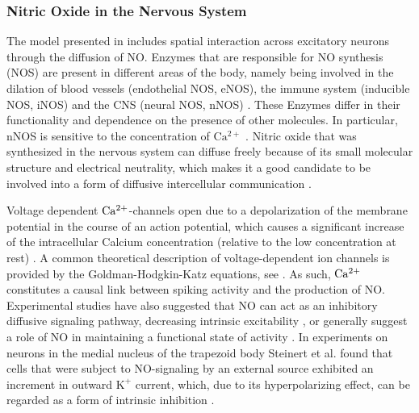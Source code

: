 \documentclass[10pt,a4paper]{article}
\begin{document}
\subsubsection{Nitric Oxide in the Nervous System}\label{NO_Experiments_Section}
The model presented in \cite{Sweeney_Paper} includes spatial interaction across excitatory neurons through the diffusion of NO. Enzymes that are responsible for NO synthesis (NOS) are present in different areas of the body, namely being involved in the dilation of blood vessels (endothelial NOS, eNOS), the immune system (inducible NOS, iNOS) and the CNS (neural NOS, nNOS) \cite{NOS_Mammals}. These Enzymes differ in their functionality and dependence on the presence of other molecules. In particular, nNOS is sensitive to the concentration of $\mathrm{Ca^{2+}}$ \cite{Knowles_Ca_nNOS,Steinert_NO}. Nitric oxide that was synthesized in the nervous system can diffuse freely because of its small molecular structure and electrical neutrality, which makes it a good candidate to be involved into a form of diffusive intercellular communication \cite{Lancaster_1994}. 

Voltage dependent $\rm Ca^{2+}$-channels open due to a depolarization of the membrane potential in the course of an action potential, which causes a significant increase of the intracellular Calcium concentration (relative to the low concentration at rest) \cite[p.~98--100]{Hille_Ion_Channels}. A common theoretical description of voltage-dependent ion channels is provided by the Goldman-Hodgkin-Katz equations, see \cite[p.~445--451]{Hille_Ion_Channels}. As such, $\rm Ca^{2+}$ constitutes a causal link between spiking activity and the production of NO. Experimental studies have also suggested that NO can act as an inhibitory diffusive signaling pathway, decreasing intrinsic excitability \cite{Steinert_NO_2011}, or generally suggest a role of NO in maintaining a functional state of activity \cite{Pape_NO}. In experiments on neurons in the medial nucleus of the trapezoid body Steinert et al. found that cells that were subject to NO-signaling by an external source exhibited an increment in outward $\mathrm{K^+}$ current, which, due to its hyperpolarizing effect, can be regarded as a form of intrinsic inhibition \cite{Steinert_NO}. 
\end{document}
